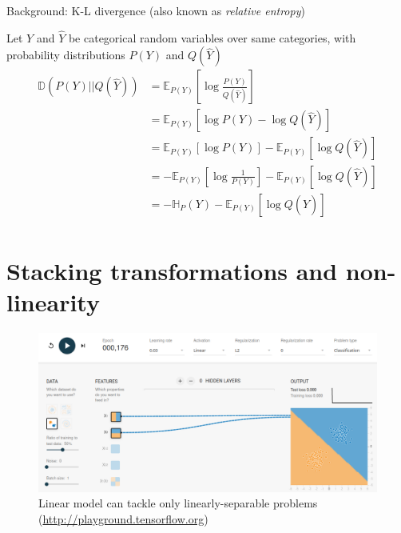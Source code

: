 \documentclass[12pt,aspectratio=169,handout]{beamer}
\begin{document}
\begin{frame}{Background: K-L divergence (also known as \emph{relative entropy})}
	
	Let $Y$ and $\hat{Y}$ be categorical random variables over same categories, with probability distributions $P(Y)$ and $Q(\hat{Y})$
	\begin{align*}
		\mathbb{D}(P(Y) || Q(\hat{Y})) &= \mathbb{E}_{P(Y)} \left[ \log \frac{P(Y)}{Q(\hat{Y})} \right] \\
		&= \mathbb{E}_{P(Y)} \left[ \log P(Y) - \log Q(\hat{Y}) \right] \\
		&= \mathbb{E}_{P(Y)} \left[ \log P(Y)\right] - \mathbb{E}_{P(Y)} \left[ \log Q(\hat{Y}) \right] \\
		&= - \mathbb{E}_{P(Y)} \left[ \log \frac{1}{P(Y)}\right] - \mathbb{E}_{P(Y)} \left[ \log Q(\hat{Y}) \right] \\
		&= - \mathbb{H}_{P} (Y)  - \mathbb{E}_{P(Y)} \left[ \log Q(\hat{Y}) \right] \\
	\end{align*}
	
\end{frame}



\section{Stacking transformations and non-linearity}


\begin{frame}
	\begin{figure}
		\vspace{-1.3em}
		\includegraphics[width=1.35\linewidth]{img/linear1.png}	
		\caption{Linear model can tackle only linearly-separable problems (\url{http://playground.tensorflow.org})}
	\end{figure}	
\end{frame}
\end{document}
